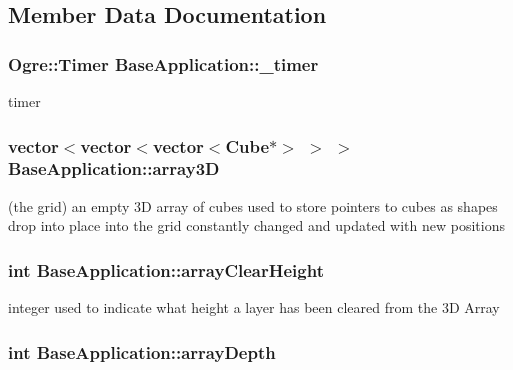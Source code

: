 \subsection{Member Data Documentation}
\hypertarget{class_base_application_a7e2bb2cec7b0185bf861d5bf5f8c015c}{
\subsubsection[{\-\_\-timer}]{\setlength{\rightskip}{0pt plus 5cm}Ogre\-::\-Timer Base\-Application\-::\-\_\-timer\hspace{0.3cm}{\ttfamily [protected]}}}\label{class_base_application_a7e2bb2cec7b0185bf861d5bf5f8c015c}
timer \hypertarget{class_base_application_a1d4876d5a2f4d69a9a0fae61ee8f5127}{
\subsubsection[{array3\-D}]{\setlength{\rightskip}{0pt plus 5cm}vector$<$vector$<$vector$<${\bf Cube}$\ast$$>$ $>$ $>$ Base\-Application\-::array3\-D\hspace{0.3cm}{\ttfamily [protected]}}}\label{class_base_application_a1d4876d5a2f4d69a9a0fae61ee8f5127}
(the grid) an empty 3\-D array of cubes used to store pointers to cubes as shapes drop into place into the grid constantly changed and updated with new positions \hypertarget{class_base_application_a1c1a812d975a0a98781314580f84c920}{
\subsubsection[{array\-Clear\-Height}]{\setlength{\rightskip}{0pt plus 5cm}int Base\-Application\-::array\-Clear\-Height\hspace{0.3cm}{\ttfamily [protected]}}}\label{class_base_application_a1c1a812d975a0a98781314580f84c920}
integer used to indicate what height a layer has been cleared from the 3\-D Array \hypertarget{class_base_application_a365f02117f2afc6bc4d54aa7569cbee5}{
\subsubsection[{array\-Depth}]{\setlength{\rightskip}{0pt plus 5cm}int Base\-Application\-::array\-Depth\hspace{0.3cm}{\ttfamily [protected]}}}\label{class_base_application_a365f02117f2afc6bc4d54aa7569cbee5}
